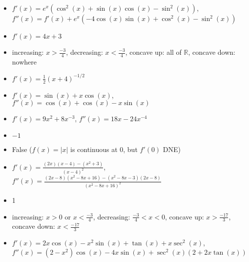 \documentclass{article}
\newcommand{\R}{\mathbb{R}}
\begin{document}
\begin{itemize}
\item $f'(x)=e^{x}(\cos^{2}(x)+\sin(x)\cos(x)-\sin^{2}(x))$, $f''(x)=f'(x)+e^{x}\left(-4\cos\left(x\right)\sin\left(x\right)+\cos^{2}\left(x\right)-\sin^{2}\left(x\right)\right)$
\item $f'(x)=4x + 3$
\item increasing: $x>\frac{-3}{4}$, decreasing: $x<\frac{-3}{4}$, concave up: all of $\R$, concave down: nowhere
\item $f'(x)=\frac{1}{2}(x+4)^{-1/2}$
\item $f'(x)=\sin(x) + x\cos(x)$, $f''(x)=\cos(x) + \cos(x) -x\sin(x)$
\item $f'(x)=9x^2+8x^{-3}$, $f''(x)=18x-24x^{-4}$
\item $-1$
\item False ($f(x)=|x|$ is continuous at $0$, but $f'(0)$ DNE)
\item $f'(x)=\frac{(2x)(x-4)-(x^2+3)}{(x-4)^2}$, $f''(x)=\frac{(2x-8)(x^2-8x+16)-(x^2-8x-3)(2x-8)}{(x^2-8x+16)^2}$
\item 1
\item increasing: $x>0$ or $x<\frac{-3}{4}$, decreasing: $\frac{-3}{4}<x<0$, concave up: $x>\frac{-17}{3}$, concave down: $x<\frac{-17}{3}$
\item $f'(x)=2x\cos(x)-x^2\sin(x)+\tan(x)+x\sec^2(x)$, $f''(x)=\left(2-x^{2}\right)\cos\left(x\right)-4x\sin\left(x\right)+\sec^{2}\left(x\right)\left(2+2x\tan\left(x\right)\right)$
\end{itemize}
\end{document}
